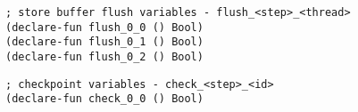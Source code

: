 
\begin{algorithm}[H]
\end{algorithm}

\begin{algorithm}[H]
\end{algorithm}

\begin{lstlisting}[language=SMTLib]
; store buffer flush variables - flush_<step>_<thread>
(declare-fun flush_0_0 () Bool)
(declare-fun flush_0_1 () Bool)
(declare-fun flush_0_2 () Bool)
\end{lstlisting}


\begin{algorithm}[H]
\end{algorithm}

\begin{algorithm}[H]
\end{algorithm}

\begin{lstlisting}[language=SMTLib]
; checkpoint variables - check_<step>_<id>
(declare-fun check_0_0 () Bool)
\end{lstlisting}



\begin{algorithm}[H]
\end{algorithm}


